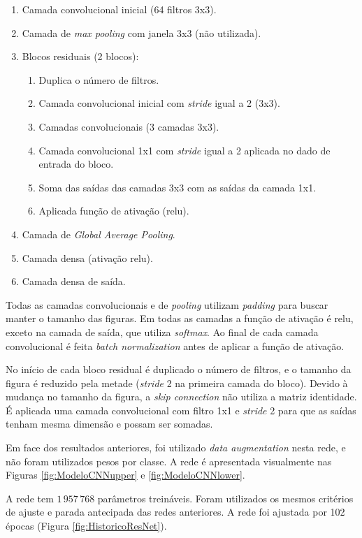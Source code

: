\documentclass[final,5p]{elsarticle}
\numberwithin{equation}{section}
\begin{document}
    \begin{enumerate}
        \item Camada convolucional inicial (64 filtros 3x3).
        \item Camada de \emph{max pooling} com janela 3x3 (não utilizada).
        \item Blocos residuais (2 blocos):
        \begin{enumerate}
            \item Duplica o número de filtros.
            \item Camada convolucional inicial com \emph{stride} igual a 2 (3x3).
            \item Camadas convolucionais (3 camadas 3x3).
            \item Camada convolucional 1x1 com \emph{stride} igual a 2 aplicada no dado de entrada do bloco.
            \item Soma das saídas das camadas 3x3 com as saídas da camada 1x1.
            \item Aplicada função de ativação (relu).
        \end{enumerate}
        \item Camada de \emph{Global Average Pooling}.
        \item Camada densa (ativação relu).
        \item Camada densa de saída.
    \end{enumerate}

    Todas as camadas convolucionais e de \emph{pooling} utilizam \emph{padding} para buscar manter o tamanho das figuras. Em todas as camadas a função de ativação é relu, exceto na camada de saída, que utiliza \emph{softmax}. Ao final de cada camada convolucional é feita \emph{batch normalization} antes de aplicar a função de ativação.

    No início de cada bloco residual é duplicado o número de filtros, e o tamanho da figura é reduzido pela metade (\emph{stride} 2 na primeira camada do bloco). Devido à mudança no tamanho da figura, a \emph{skip connection} não utiliza a matriz identidade. É aplicada uma camada convolucional com filtro 1x1 e \emph{stride} 2 para que as saídas tenham mesma dimensão e possam ser somadas.

    Em face dos resultados anteriores, foi utilizado \emph{data augmentation} nesta rede, e não foram utilizados pesos por classe. A rede é apresentada visualmente nas Figuras \ref{fig:ModeloCNNupper} e \ref{fig:ModeloCNNlower}.

    A rede tem $1\,957\,768$ parâmetros treináveis. Foram utilizados os mesmos critérios de ajuste e parada antecipada das redes anteriores. A rede foi ajustada por 102 épocas (Figura \ref{fig:HistoricoResNet}).
\end{document}
